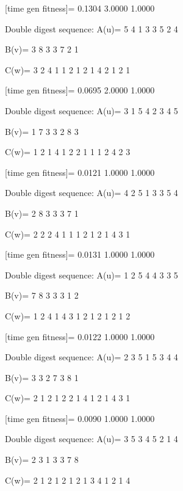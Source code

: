 [time gen fitness]=
    0.1304    3.0000    1.0000

Double digest sequence:
A(u)=
     5     4     1     3     3     5     2     4

B(v)=
     3     8     3     3     7     2     1

C(w)=
     3     2     4     1     1     2     1     2     1     4     2     1     2     1

[time gen fitness]=
    0.0695    2.0000    1.0000

Double digest sequence:
A(u)=
     3     1     5     4     2     3     4     5

B(v)=
     1     7     3     3     2     8     3

C(w)=
     1     2     1     4     1     2     2     1     1     1     2     4     2     3

[time gen fitness]=
    0.0121    1.0000    1.0000

Double digest sequence:
A(u)=
     4     2     5     1     3     3     5     4

B(v)=
     2     8     3     3     3     7     1

C(w)=
     2     2     2     4     1     1     1     2     1     2     1     4     3     1

[time gen fitness]=
    0.0131    1.0000    1.0000

Double digest sequence:
A(u)=
     1     2     5     4     4     3     3     5

B(v)=
     7     8     3     3     3     1     2

C(w)=
     1     2     4     1     4     3     1     2     1     2     1     2     1     2

[time gen fitness]=
    0.0122    1.0000    1.0000

Double digest sequence:
A(u)=
     2     3     5     1     5     3     4     4

B(v)=
     3     3     2     7     3     8     1

C(w)=
     2     1     2     1     2     2     1     4     1     2     1     4     3     1

[time gen fitness]=
    0.0090    1.0000    1.0000

Double digest sequence:
A(u)=
     3     5     3     4     5     2     1     4

B(v)=
     2     3     1     3     3     7     8

C(w)=
     2     1     2     1     2     1     2     1     3     4     1     2     1     4

